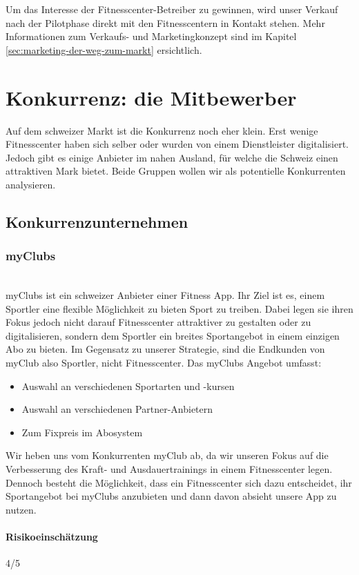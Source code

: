 Um das Interesse der Fitnesscenter-Betreiber zu gewinnen, wird unser Verkauf nach der Pilotphase direkt mit den Fitnesscentern in Kontakt stehen. Mehr Informationen zum Verkaufs- und Marketingkonzept sind im Kapitel \ref{sec:marketing-der-weg-zum-markt} ersichtlich.


\clearpage
\section{Konkurrenz: die Mitbewerber}\label{sec:konkurrenz-die-mitbewerber}

Auf dem schweizer Markt ist die Konkurrenz noch eher klein. Erst wenige Fitnesscenter haben sich selber oder wurden von einem Dienstleister digitalisiert. Jedoch gibt es einige Anbieter im nahen Ausland, für welche die Schweiz einen attraktiven Mark bietet. Beide Gruppen wollen wir als potentielle Konkurrenten analysieren.
\subsection{Konkurrenzunternehmen}
\subsubsection{myClubs}\hfill \\
myClubs\cite{myclubs} ist ein schweizer Anbieter einer Fitness App. Ihr Ziel ist es, einem Sportler eine flexible Möglichkeit zu bieten Sport zu treiben. Dabei legen sie ihren Fokus jedoch nicht darauf Fitnesscenter attraktiver zu gestalten oder zu digitalisieren, sondern dem Sportler ein breites Sportangebot in einem einzigen Abo zu bieten. Im Gegensatz zu unserer Strategie, sind die Endkunden von myClub also Sportler, nicht Fitnesscenter.
Das myClubs Angebot umfasst:
\begin{itemize}
	\item Auswahl an verschiedenen Sportarten und -kursen
	\item Auswahl an verschiedenen Partner-Anbietern
	\item Zum Fixpreis im Abosystem
\end{itemize}
Wir heben uns vom Konkurrenten myClub ab, da wir unseren Fokus auf die Verbesserung des Kraft- und Ausdauertrainings in einem Fitnesscenter legen. Dennoch besteht die Möglichkeit, dass ein Fitnesscenter sich dazu entscheidet, ihr Sportangebot bei myClubs anzubieten und dann davon absieht unsere App zu nutzen.
\paragraph{Risikoeinschätzung} \qquad {} 4/5

